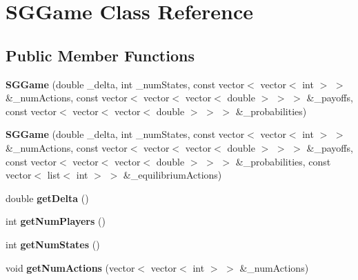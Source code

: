 \hypertarget{class_s_g_game}{\section{S\+G\+Game Class Reference}
\label{class_s_g_game}
}
\subsection*{Public Member Functions}
\begin{DoxyCompactItemize}
\item 
\hypertarget{class_s_g_game_ad881fb3f3db38d4b7c2ea0beb7181fc0}{{\bfseries S\+G\+Game} (double \+\_\+delta, int \+\_\+num\+States, const vector$<$ vector$<$ int $>$ $>$ \&\+\_\+num\+Actions, const vector$<$ vector$<$ vector$<$ double $>$ $>$ $>$ \&\+\_\+payoffs, const vector$<$ vector$<$ vector$<$ double $>$ $>$ $>$ \&\+\_\+probabilities)}\label{class_s_g_game_ad881fb3f3db38d4b7c2ea0beb7181fc0}

\item 
\hypertarget{class_s_g_game_aa1da411d5e3a0b36156444b3795663d2}{{\bfseries S\+G\+Game} (double \+\_\+delta, int \+\_\+num\+States, const vector$<$ vector$<$ int $>$ $>$ \&\+\_\+num\+Actions, const vector$<$ vector$<$ vector$<$ double $>$ $>$ $>$ \&\+\_\+payoffs, const vector$<$ vector$<$ vector$<$ double $>$ $>$ $>$ \&\+\_\+probabilities, const vector$<$ list$<$ int $>$ $>$ \&\+\_\+equilibrium\+Actions)}\label{class_s_g_game_aa1da411d5e3a0b36156444b3795663d2}

\item 
\hypertarget{class_s_g_game_aae8be42a1c507d962e7263054cc2afa4}{double {\bfseries get\+Delta} ()}\label{class_s_g_game_aae8be42a1c507d962e7263054cc2afa4}

\item 
\hypertarget{class_s_g_game_a20dc7aba084d931a12c0096395f695a0}{int {\bfseries get\+Num\+Players} ()}\label{class_s_g_game_a20dc7aba084d931a12c0096395f695a0}

\item 
\hypertarget{class_s_g_game_a404f3cd266a1c15d12f987cd03667043}{int {\bfseries get\+Num\+States} ()}\label{class_s_g_game_a404f3cd266a1c15d12f987cd03667043}

\item 
\hypertarget{class_s_g_game_ae977ed75988e75ea0a425f4c4958bc8e}{void {\bfseries get\+Num\+Actions} (vector$<$ vector$<$ int $>$ $>$ \&\+\_\+num\+Actions)}\label{class_s_g_game_ae977ed75988e75ea0a425f4c4958bc8e}


\end{DoxyCompactItemize}
